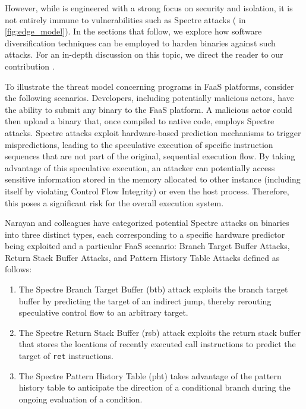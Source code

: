 However, while \Wasm is engineered with a strong focus on security and isolation, it is not entirely immune to vulnerabilities such as Spectre attacks \cite{Spectre,Narayan2021Swivel} ( in \autoref{fig:edge_model}). 
In the sections that follow, we explore how software diversification techniques can be employed to harden \Wasm binaries against such attacks. For an in-depth discussion on this topic, we direct the reader to our contribution \cite{wasmmutate}.


To illustrate the threat model concerning \Wasm programs in FaaS platforms, consider the following scenarios. 
Developers, including potentially malicious actors, have the ability to submit any \Wasm binary to the FaaS platform. 
A malicious actor could then upload a \Wasm binary that, once compiled to native code, employs Spectre attacks.
Spectre attacks exploit hardware-based prediction mechanisms to trigger mispredictions, leading to the speculative execution of specific instruction sequences that are not part of the original, sequential execution flow. 
By taking advantage of this speculative execution, an attacker can potentially access sensitive information stored in the memory allocated to other \Wasm instance (including itself by violating Control Flow Integrity) or even the host process. 
Therefore, this poses a significant risk for the overall execution system.

Narayan and colleagues \cite{Narayan2021Swivel} have categorized potential Spectre attacks on \Wasm binaries into three distinct types, each corresponding to a specific hardware predictor being exploited and a particular FaaS scenario: Branch Target Buffer Attacks,  Return Stack Buffer Attacks, and Pattern History Table Attacks defined as follows:

\begin{enumerate}
    \item The Spectre Branch Target Buffer (btb) attack exploits the branch target buffer by predicting the target of an indirect jump, thereby rerouting speculative control flow to an arbitrary target.
    \item  The Spectre Return Stack Buffer (rsb) attack exploits the return stack buffer that stores the locations of recently executed call instructions to predict the target of \texttt{ret} instructions.
    \item The Spectre Pattern History Table (pht) takes advantage of the pattern history table to anticipate the direction of a conditional branch during the ongoing evaluation of a condition.
\end{enumerate}



